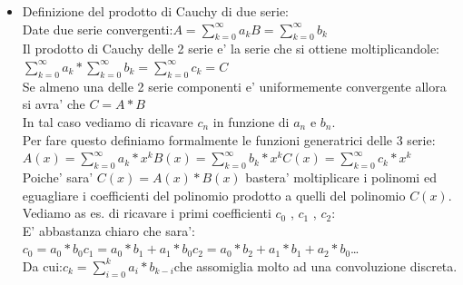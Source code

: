 \documentclass[12pt,a4paper]{article}
\begin{document}
\begin{flushleft}
\begin{itemize}

\item{Definizione del prodotto di Cauchy di due serie:\\
\vspace{5mm}
Date due serie convergenti:\hspace{20mm}$A=\sum_{k=0}^{\infty} a_k$\hspace{20mm}$B=\sum_{k=0}^{\infty} b_k$\\
\vspace{5mm}
Il prodotto di Cauchy delle 2 serie e' la serie che si ottiene moltiplicandole:\\
\vspace{5mm}
$\sum_{k=0}^{\infty} a_k * \sum_{k=0}^{\infty} b_k=\sum_{k=0}^{\infty} c_k = C$\\
\vspace{5mm}
Se almeno una delle 2 serie componenti e' uniformemente convergente allora si avra' che $C=A*B$\\
In tal caso vediamo di ricavare $c_n$ in funzione di $a_n$ e $b_n$.\\
Per fare questo definiamo formalmente le funzioni generatrici delle 3 serie:\\
\vspace{5mm}
$A(x)=\sum_{k=0}^{\infty} a_k * x^k$\hspace{10mm}$B(x)=\sum_{k=0}^{\infty} b_k * x^k$\hspace{10mm}$C(x)=\sum_{k=0}^{\infty} c_k * x^k$\\
\vspace{5mm}
Poiche' sara' $C(x)=A(x)*B(x)$ bastera' moltiplicare i polinomi ed eguagliare i coefficienti del polinomio prodotto a quelli del polinomio $C(x)$.\\
Vediamo as es. di ricavare i primi coefficienti $c_0$ , $ c_1$ , $ c_2$:\\
\vspace{5mm}
E' abbastanza chiaro che sara':\\
$c_0=a_0*b_0$\hspace{10mm}$c_1=a_0*b_1+a_1*b_0$\hspace{10mm}$c_2=a_0*b_2+a_1*b_1+a_2*b_0$\hspace{10mm}\dots\\
\vspace{5mm}
Da cui:\hspace{10mm}$c_k=\sum_{i=0}^{k} a_i * b_{k-i}$\hspace{10mm}che assomiglia molto ad una convoluzione discreta.\\
}
\end{itemize}
\end{flushleft}
\end{document}
